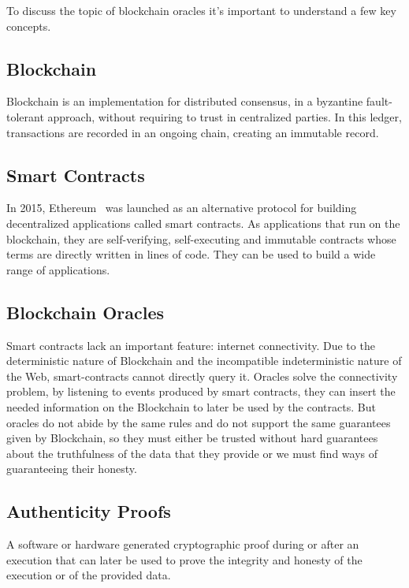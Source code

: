\documentclass[final,3p,12pt,twocolumn]{elsarticle}
\begin{document}
To discuss the topic of blockchain oracles it's important to understand a few key concepts.

\subsection{Blockchain}
Blockchain is an implementation for distributed consensus, in a byzantine fault-tolerant approach, without requiring to trust in centralized parties. In this ledger, transactions are recorded in an ongoing chain, creating an immutable record.

\subsection{Smart Contracts}
In 2015, Ethereum~\cite{GavinWood2014} was launched as an alternative protocol for building decentralized applications called smart contracts. As applications that run on the blockchain, they are self-verifying, self-executing and immutable contracts whose terms are directly written in lines of code. They can be used to build a wide range of applications.

\subsection{Blockchain Oracles}
Smart contracts lack an important feature: internet connectivity. Due to the deterministic nature of Blockchain and the incompatible indeterministic nature of the Web, smart-contracts cannot directly query it.
Oracles solve the connectivity problem, by listening to events produced by smart contracts, they can insert the needed information on the Blockchain to later be used by the contracts. But oracles do not abide by the same rules and do not support the same guarantees given by Blockchain, so they must either be trusted without hard guarantees about the truthfulness of the data that they provide or we must find ways of guaranteeing their honesty.

\subsection{Authenticity Proofs}
A software or hardware generated cryptographic proof during or after an execution that can later be used to prove the integrity and honesty of the execution or of the provided data.
\end{document}

